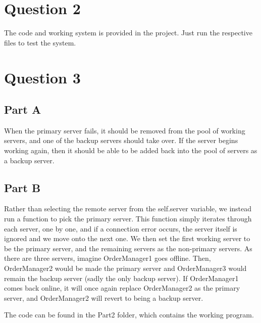 \documentclass[12pt,fleqn,leqno,letterpaper]{article}
\begin{document}
\section*{Question 2}
    The code and working system is provided in the project. Just run the respective files to test the system.

\section*{Question 3}
\subsection*{Part A}
    When the primary server fails, it should be removed from the pool of working servers, and one of the backup servers
    should take over. If the server begins working again, then it should be able to be added back into the pool of servers as a backup server.

\subsection*{Part B}
Rather than selecting the remote server from the self.server variable, we instead run a function to pick the primary server.
 This function simply iterates through each server, one by one, and if a connection error occurs, the server itself is ignored
 and we move onto the next one. We then set the first working server to be the primary server, and the remaining servers
 as the non-primary servers. As there are three servers, imagine OrderManager1 goes offline. Then, OrderManager2 would be
 made the primary server and OrderManager3 would remain the backup server (sadly the only backup server). If OrderManager1
 comes back online, it will once again replace OrderManager2 as the primary server, and OrderManager2 will revert to being
 a backup server.

The code can be found in the Part2 folder, which contains the working program.
\end{document}
